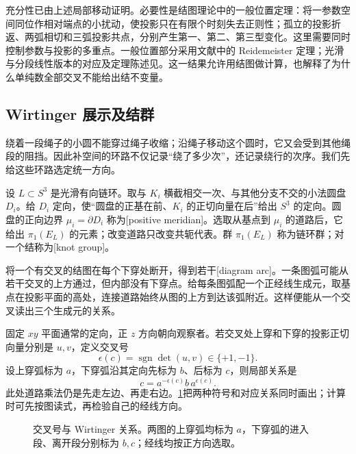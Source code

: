充分性已由上述局部移动证明。必要性是结图理论中的一般位置定理：将一参数空间同位作相对端点的小扰动，使投影只在有限个时刻失去正则性；孤立的投影折返、两弧相切和三弧投影共点，分别产生第一、第二、第三型变化。这里需要同时控制参数与投影的多重点。一般位置部分采用文献中的 Reidemeister 定理；光滑与分段线性版本的对应及定理陈述见\cite[第1章，第2--4页]{Lickorish1997KnotTheory}。这一结果允许用结图做计算，也解释了为什么单纯数全部交叉不能给出结不变量。

\subsection{Wirtinger 展示及结群}
\label{g2:subsec:A01:02}

绕着一段绳子的小圆不能穿过绳子收缩；沿绳子移动这个圆时，它又会受到其他绳段的阻挡。因此补空间的环路不仅记录“绕了多少次”，还记录绕行的次序。我们先给这些环路选定统一方向。

\begin{definition}\label{g2:def:meridian-knot-group}
	设 \(L\subset S^3\) 是光滑有向链环。取与 \(K_i\) 横截相交一次、与其他分支不交的小法圆盘 \(D_i\)。给 \(D_i\) 定向，使“圆盘的正基在前、\(K_i\) 的正切向量在后”给出 \(S^3\) 的定向。圆盘的正向边界 \(\mu_i=\partial D_i\) 称为[positive meridian]。选取从基点到 \(\mu_i\) 的道路后，它给出 \(\pi_1(E_L)\) 的元素；改变道路只改变共轭代表。群 \(\pi_1(E_L)\) 称为链环群；对一个结称为[knot group]。
\end{definition}

将一个有交叉的结图在每个下穿处断开，得到若干[diagram arc]。一条图弧可能从若干交叉的上方通过，但内部没有下穿点。给每条图弧配一个正经线生成元，取基点在投影平面的高处，连接道路始终从图的上方到达该弧附近。这样便能从一个交叉读出三个生成元的关系。

\ProseParagraphBreak

固定 \(xy\) 平面通常的定向，正 \(z\) 方向朝向观察者。若交叉处上穿和下穿的投影正切向量分别是 \(u,v\)，定义交叉号
\[
	\epsilon(c)=\operatorname{sgn}\det(u,v)\in\{+1,-1\}.
\]
设上穿弧标为 \(a\)，下穿弧沿其定向先标为 \(b\)、后标为 \(c\)，则局部关系是
\begin{equation}\label{g2:eq:wirtinger-relation}
	c=a^{-\epsilon(c)}b\,a^{\epsilon(c)}.
\end{equation}
此处道路乘法仍是先走左边、再走右边。\cref{g2:fig:wirtinger-sign}把两种符号和对应关系同时画出；计算时可先按图读式，再检验自己的经线方向。

\begin{figure}[htbp]
	\centering
	
	\caption[交叉号与 Wirtinger 关系]{交叉号与 Wirtinger 关系。两图的上穿弧均标为 \(a\)，下穿弧的进入段、离开段分别标为 \(b,c\)；经线均按正方向选取。}
	\label{g2:fig:wirtinger-sign}
\end{figure}

